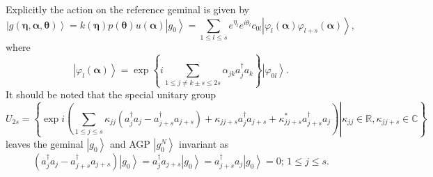 \documentclass[aps,preprint]{revtex4}%
\begin{document}
Explicitly the action on the reference geminal is given by
\begin{equation}
\left\vert g\left(  \mathbf{\eta},\mathbf{\alpha},\mathbf{\theta}\right)
\right\rangle =k\left(  \mathbf{\eta}\right)  p\left(  \mathbf{\theta}\right)
u\left(  \mathbf{\alpha}\right)  \left\vert g_{0}\right\rangle =\sum_{1\leq
l\leq s}e^{\eta_{l}}e^{i\theta_{l}}c_{0l}\left\vert \varphi_{l}\left(
\mathbf{\alpha}\right)  \varphi_{l+s}\left(  \mathbf{\alpha}\right)
\right\rangle ,
\end{equation}
where
\begin{equation}
\left\vert \varphi_{l}\left(  \mathbf{\alpha}\right)  \right\rangle
=\exp\left\{  i\sum_{1\leq j\neq k\pm s\leq2s}\alpha_{jk}a_{j}^{\dagger}%
a_{k}\right\}  \left\vert \varphi_{0l}\right\rangle .
\end{equation}
It should be noted that the special unitary group
\begin{equation}
U_{2s}=\left\{  \left.  \exp i\left(  \sum_{1\leq j\leq s}\kappa_{jj}\left(
a_{j}^{\dagger}a_{j}-a_{j+s}^{\dagger}a_{j+s}\right)  +\kappa_{jj+s}%
a_{j}^{\dagger}a_{j+s}+\kappa_{jj+s}^{\ast}a_{j+s}^{\dagger}a_{j}\right)
\right\vert \kappa_{jj}\in\mathbb{R},\kappa_{jj+s}\in\mathbb{C}\right\}
\label{iso}%
\end{equation}
leaves the geminal $\left\vert g_{0}\right\rangle $ and AGP $\left\vert
g_{0}^{N}\right\rangle $ invariant as
\begin{equation}
\left(  a_{j}^{\dagger}a_{j}-a_{j+s}^{\dagger}a_{j+s}\right)  \left\vert
g_{0}\right\rangle =a_{j}^{\dagger}a_{j+s}\left\vert g_{0}\right\rangle
=a_{j+s}^{\dagger}a_{j}\left\vert g_{0}\right\rangle =0;\,1\leq j\leq s.
\label{iso1}%
\end{equation}
\end{document}
